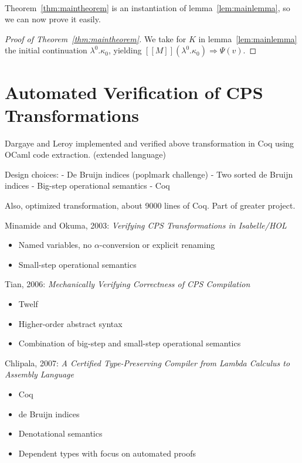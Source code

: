 \documentclass[a4paper,11pt,draft]{article}
\begin{document}
\paragraph{}

Theorem~\ref{thm:maintheorem} is an instantiation of
lemma~\ref{lem:mainlemma}, so we can now prove it easily.

\begin{proof}[Proof of Theorem~\ref{thm:maintheorem}]
We take for $K$ in lemma~\ref{lem:mainlemma} the initial continuation
$\lambda^{0}.\kappa_{0}$, yielding
$[\![M]\!] (\lambda^{0}.\kappa_{0}) \Rightarrow \Psi(v)$.
\end{proof}


\section{Automated Verification of CPS Transformations}\label{sec:automated}

Dargaye and Leroy implemented and verified above transformation in Coq using
OCaml code extraction. (extended language)

Design choices:
- De Bruijn indices (poplmark challenge)
- Two sorted de Bruijn indices
- Big-step operational semantics
- Coq

Also, optimized transformation, about 9000 lines of Coq. Part of greater project.

Minamide and Okuma, 2003: {\em Verifying CPS Transformations in Isabelle/HOL}
\begin{itemize}
\item Named variables, no $\alpha$-conversion or explicit renaming
\item Small-step operational semantics
\end{itemize}

Tian, 2006: {\em Mechanically Verifying Correctness of CPS Compilation}
\begin{itemize}
\item Twelf
\item Higher-order abstract syntax
\item Combination of big-step and small-step operational semantics
\end{itemize}

Chlipala, 2007: {\em A Certified Type-Preserving Compiler from Lambda Calculus to Assembly Language}
\begin{itemize}
\item Coq
\item de Bruijn indices
\item Denotational semantics
\item Dependent types with focus on automated proofs
\end{itemize}
\end{document}
